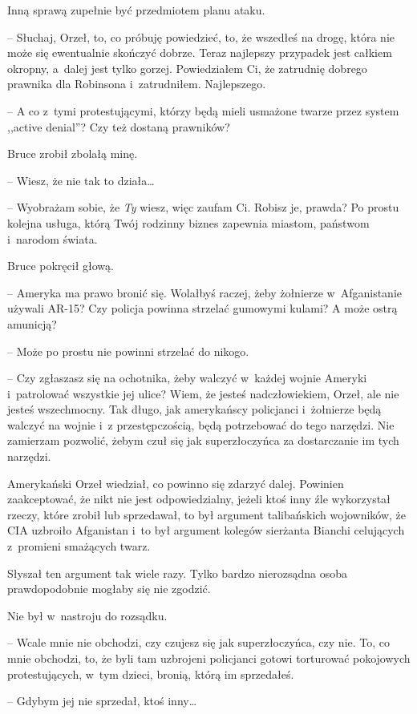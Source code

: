 \documentclass[oneside,polish,11pt,sfheadings]{mwbk}
\begin{document}
Inną sprawą zupełnie być przedmiotem planu ataku.

-- Słuchaj, Orzeł, to, co próbuję powiedzieć, to, że wszedłeś na drogę,
która nie może się ewentualnie skończyć dobrze. Teraz najlepszy
przypadek jest całkiem okropny, a~dalej jest tylko gorzej. Powiedziałem
Ci, że zatrudnię dobrego prawnika dla Robinsona i~zatrudniłem.
Najlepszego.

-- A co z~tymi protestującymi, którzy będą mieli usmażone twarze przez
system ,,active denial''? Czy też dostaną prawników?

Bruce zrobił zbolałą minę. 

-- Wiesz, że nie tak to działa\ldots 

-- Wyobrażam sobie, że \textit{Ty} wiesz, więc zaufam Ci. Robisz je,
prawda? Po prostu kolejna usługa, którą Twój rodzinny biznes zapewnia
miastom, państwom i~narodom świata.

Bruce pokręcił głową. 

-- Ameryka ma prawo bronić się. Wolałbyś raczej,
żeby żołnierze w~Afganistanie używali AR-15? Czy policja powinna
strzelać gumowymi kulami? A może ostrą amunicją?

-- Może po prostu nie powinni strzelać do nikogo.

-- Czy zgłaszasz się na ochotnika, żeby walczyć w~każdej wojnie Ameryki i~patrolować wszystkie jej ulice? Wiem, że jesteś nadczłowiekiem, Orzeł,
ale nie jesteś wszechmocny. Tak długo, jak amerykańscy policjanci i~żołnierze będą walczyć na wojnie i~z przestępczością, będą potrzebować
do tego narzędzi. Nie zamierzam pozwolić, żebym czuł się jak
superzłoczyńca za dostarczanie im tych narzędzi.

Amerykański Orzeł wiedział, co powinno się zdarzyć dalej. Powinien
zaakceptować, że nikt nie jest odpowiedzialny, jeżeli ktoś inny źle
wykorzystał rzeczy, które zrobił lub sprzedawał, to był argument
talibańskich wojowników, że CIA uzbroiło Afganistan i~to był argument
kolegów sierżanta Bianchi celujących z~promieni smażących twarz.

Słyszał ten argument tak wiele razy. Tylko bardzo nierozsądna osoba
prawdopodobnie mogłaby się nie zgodzić.

Nie był w~nastroju do rozsądku.

-- Wcale mnie nie obchodzi, czy czujesz się jak superzłoczyńca, czy nie.
To, co mnie obchodzi, to, że byli tam uzbrojeni policjanci gotowi
torturować pokojowych protestujących, w~tym dzieci, bronią, którą im
sprzedałeś.

-- Gdybym jej nie sprzedał, ktoś inny\ldots 
\end{document}

